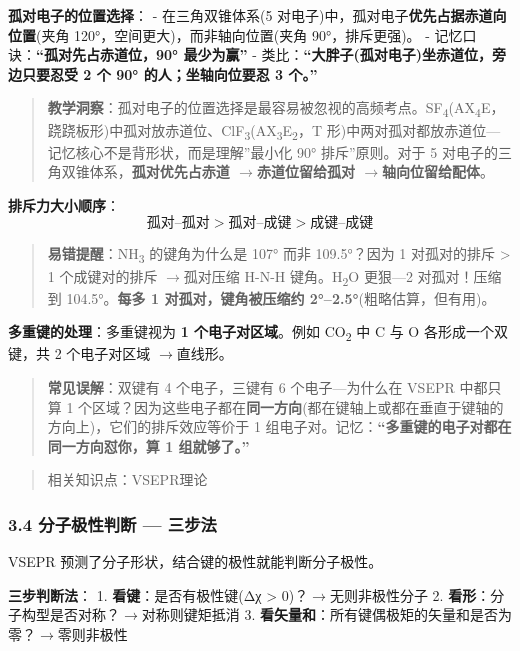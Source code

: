 \documentclass[a4paper,11pt]{ctexart}
\newcommand{\箭}{\ensuremath{\rightarrow}}
\newcommand{\左箭}{\ensuremath{\leftarrow}}
\newcommand{\上箭}{\ensuremath{\uparrow}}
\newcommand{\下箭}{\ensuremath{\downarrow}}
\newcommand{\衡}{\ensuremath{\rightleftharpoons}}
\newcommand{\双箭}{\ensuremath{\leftrightarrow}}
\newcommand{\约等于}{\ensuremath{\approx}}
\newcommand{\小于等于}{\ensuremath{\leq}}
\newcommand{\大于等于}{\ensuremath{\geq}}
\newcommand{\不等于}{\ensuremath{\neq}}
\newcommand{\西格马}{\ensuremath{\sigma}}
\newcommand{\派}{\ensuremath{\pi}}
\begin{document}
\textbf{孤对电子的位置选择}：
- 在三角双锥体系(5 对电子)中，孤对电子\textbf{优先占据赤道向位置}(夹角 120°，空间更大)，而非轴向位置(夹角 90°，排斥更强)。
- 记忆口诀：\textbf{``孤对先占赤道位，90° 最少为赢''}
- 类比：\textbf{``大胖子(孤对电子)坐赤道位，旁边只要忍受 2 个 90° 的人；坐轴向位要忍 3 个。''}

\begin{quote}
\textbf{教学洞察}：孤对电子的位置选择是最容易被忽视的高频考点。SF\textsubscript{4}(AX\textsubscript{4}E，跷跷板形)中孤对放赤道位、ClF\textsubscript{3}(AX\textsubscript{3}E\textsubscript{2}，T 形)中两对孤对都放赤道位---记忆核心不是背形状，而是理解''最小化 90° 排斥''原则。对于 5 对电子的三角双锥体系，\textbf{孤对优先占赤道 \箭 赤道位留给孤对 \箭 轴向位留给配体}。
\end{quote}

\textbf{排斥力大小顺序}：
\[
\text{孤对–孤对} > \text{孤对–成键} > \text{成键–成键}
\]

\begin{quote}
\textbf{易错提醒}：NH\textsubscript{3} 的键角为什么是 107° 而非 109.5°？因为 1 对孤对的排斥 \textgreater{} 1 个成键对的排斥 \箭 孤对压缩 H-N-H 键角。H\textsubscript{2}O 更狠---2 对孤对！压缩到 104.5°。\textbf{每多 1 对孤对，键角被压缩约 2°--2.5°}(粗略估算，但有用)。
\end{quote}

\textbf{多重键的处理}：多重键视为 \textbf{1 个电子对区域}。例如 CO\textsubscript{2} 中 C 与 O 各形成一个双键，共 2 个电子对区域 \箭 直线形。

\begin{quote}
\textbf{常见误解}：双键有 4 个电子，三键有 6 个电子---为什么在 VSEPR 中都只算 1 个区域？因为这些电子都在\textbf{同一方向}(都在键轴上或都在垂直于键轴的方向上)，它们的排斥效应等价于 1 组电子对。记忆：\textbf{``多重键的电子对都在同一方向怼你，算 1 组就够了。''}
\end{quote}

\begin{quote}
相关知识点：VSEPR理论
\end{quote}

\subsubsection{3.4 分子极性判断 --- 三步法}\label{ux5206ux5b50ux6781ux6027ux5224ux65ad-ux4e09ux6b65ux6cd5}

VSEPR 预测了分子形状，结合键的极性就能判断分子极性。

\textbf{三步判断法}：
1. \textbf{看键}：是否有极性键(Δχ \textgreater{} 0)？\箭 无则非极性分子
2. \textbf{看形}：分子构型是否对称？\箭 对称则键矩抵消
3. \textbf{看矢量和}：所有键偶极矩的矢量和是否为零？\箭 零则非极性
\end{document}
